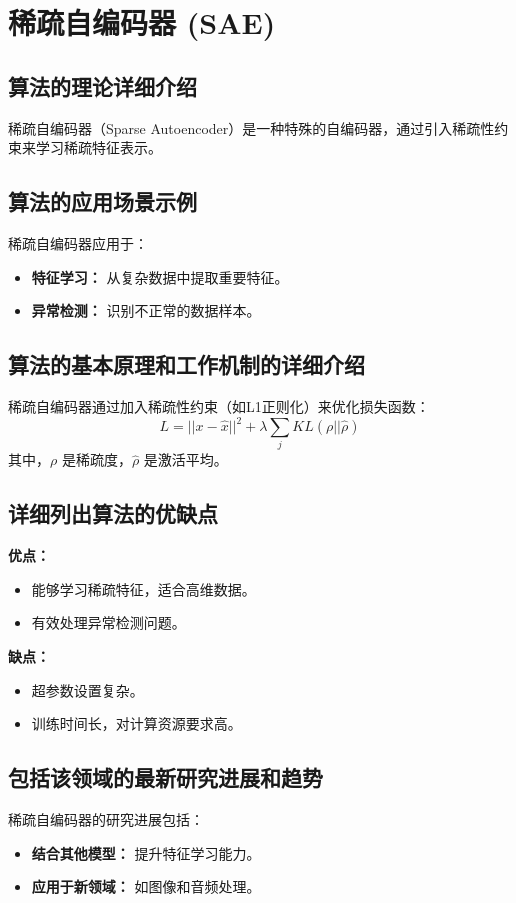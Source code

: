 \section{稀疏自编码器 (SAE)}
\subsection*{算法的理论详细介绍}
稀疏自编码器（Sparse Autoencoder）是一种特殊的自编码器，通过引入稀疏性约束来学习稀疏特征表示。

\subsection*{算法的应用场景示例}
稀疏自编码器应用于：
\begin{itemize}
    \item \textbf{特征学习：} 从复杂数据中提取重要特征。
    \item \textbf{异常检测：} 识别不正常的数据样本。
\end{itemize}

\subsection*{算法的基本原理和工作机制的详细介绍}
稀疏自编码器通过加入稀疏性约束（如L1正则化）来优化损失函数：
\[
    L = || x - \hat{x} ||^2 + \lambda \sum_{j} KL(\rho || \hat{\rho})
\]
其中，\(\rho\) 是稀疏度，\(\hat{\rho}\) 是激活平均。

\subsection*{详细列出算法的优缺点}
\textbf{优点：}
\begin{itemize}
    \item 能够学习稀疏特征，适合高维数据。
    \item 有效处理异常检测问题。
\end{itemize}

\textbf{缺点：}
\begin{itemize}
    \item 超参数设置复杂。
    \item 训练时间长，对计算资源要求高。
\end{itemize}

\subsection*{包括该领域的最新研究进展和趋势}
稀疏自编码器的研究进展包括：
\begin{itemize}
    \item \textbf{结合其他模型：} 提升特征学习能力。
    \item \textbf{应用于新领域：} 如图像和音频处理。
\end{itemize}
